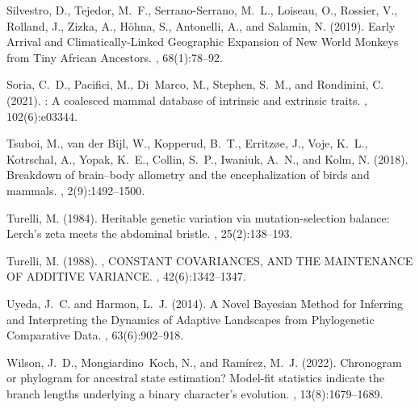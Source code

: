 \documentclass{article}
\begin{document}
\begin{thebibliography}{}
Silvestro, D., Tejedor, M.~F., {Serrano-Serrano}, M.~L., Loiseau, O., Rossier,
  V., Rolland, J., Zizka, A., H{\"o}hna, S., Antonelli, A., and Salamin, N.
  (2019).
\newblock Early {{Arrival}} and {{Climatically-Linked Geographic Expansion}} of
  {{New World Monkeys}} from {{Tiny African Ancestors}}.
, 68(1):78--92.

Soria, C.~D., Pacifici, M., Di~Marco, M., Stephen, S.~M., and Rondinini, C.
  (2021).
: A coalesced mammal database of intrinsic and extrinsic
  traits.
, 102(6):e03344.

Tsuboi, M., {van der Bijl}, W., Kopperud, B.~T., Erritz{\o}e, J., Voje, K.~L.,
  Kotrschal, A., Yopak, K.~E., Collin, S.~P., Iwaniuk, A.~N., and Kolm, N.
  (2018).
\newblock Breakdown of brain--body allometry and the encephalization of birds
  and mammals.
, 2(9):1492--1500.

Turelli, M. (1984).
\newblock Heritable genetic variation via mutation-selection balance:
  {{Lerch}}'s zeta meets the abdominal bristle.
, 25(2):138--193.

Turelli, M. (1988).
, {{CONSTANT COVARIANCES}}, {{AND THE
  MAINTENANCE OF ADDITIVE VARIANCE}}.
, 42(6):1342--1347.

Uyeda, J.~C. and Harmon, L.~J. (2014).
\newblock A {{Novel Bayesian Method}} for {{Inferring}} and {{Interpreting}}
  the {{Dynamics}} of {{Adaptive Landscapes}} from {{Phylogenetic Comparative
  Data}}.
, 63(6):902--918.

Wilson, J.~D., Mongiardino~Koch, N., and Ram{\'i}rez, M.~J. (2022).
\newblock Chronogram or phylogram for ancestral state estimation? {{Model-fit}}
  statistics indicate the branch lengths underlying a binary character's
  evolution.
, 13(8):1679--1689.

\end{thebibliography}


\end{document}
